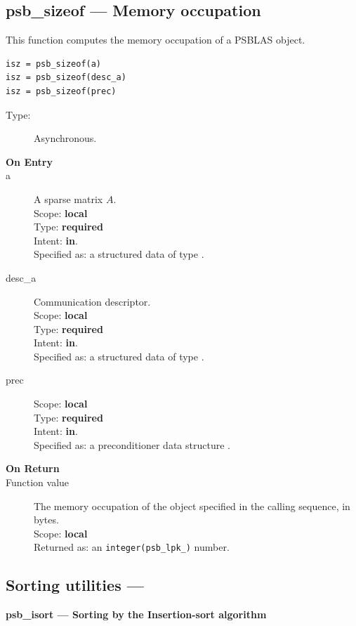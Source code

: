 \clearpage\subsection{psb\_sizeof --- Memory occupation}

This function computes the memory occupation of a PSBLAS object.


\begin{verbatim}
isz = psb_sizeof(a)
isz = psb_sizeof(desc_a)
isz = psb_sizeof(prec)
\end{verbatim}

\begin{description}
\item[Type:] Asynchronous.
\item[\bf On Entry]
\item[a] A sparse matrix
$A$. \\ 
Scope: {\bf local} \\
Type: {\bf required}\\
Intent: {\bf in}.\\
Specified as: a structured data of type \spdata.
\item[desc\_a] Communication descriptor.\\
Scope: {\bf local} \\
Type: {\bf required}\\
Intent: {\bf in}.\\
Specified as: a structured data of type \descdata.
\item[prec] 
Scope: {\bf local} \\
Type: {\bf required}\\
Intent: {\bf in}.\\
Specified as: a preconditioner data structure \precdata.
\item[\bf On Return] 
\item[Function value] The memory occupation of the object specified in
  the calling sequence, in bytes.\\
Scope: {\bf local} \\
Returned  as: an \verb|integer(psb_lpk_)| number.
\end{description}


\clearpage\subsection{Sorting utilities --- }

{\par\noindent\large\bfseries psb\_isort --- Sorting by the Insertion-sort
  algorithm}

